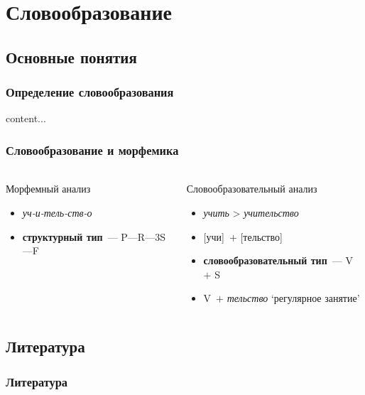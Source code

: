 \section{Словообразование}
\newrefsection

\subsection{Основные понятия}


\begin{frame}
    \frametitle{Определение словообразования}
    content...
\end{frame}

\begin{frame}
    \frametitle{Словообразование и морфемика}
    \framesubtitle{\autocite[16--19]{gerd:2004:morphology}}

    \begin{columns}
        \begin{block}{Морфемный анализ}
            \begin{itemize}
                \item \textit{уч-и-тель-ств-о}
                \item \textbf{структурный тип}~--- P---R---3S---F
            \end{itemize}
        \end{block}

        \begin{block}{Словообразовательный анализ}
            \begin{itemize}
                \item \textit{учить} > \textit{учительство}
                \item {[учи]}~$+$ [тельство]
                \item \textbf{словообразовательный тип}~--- V~$+$ S
                \item V~$+$ \textit{тельство} `регулярное занятие'
            \end{itemize}
        \end{block}

    \end{columns}
\end{frame}


\subsection{Литература}


\begin{frame}
    \frametitle{Литература}
    \printbibliography
\end{frame}
